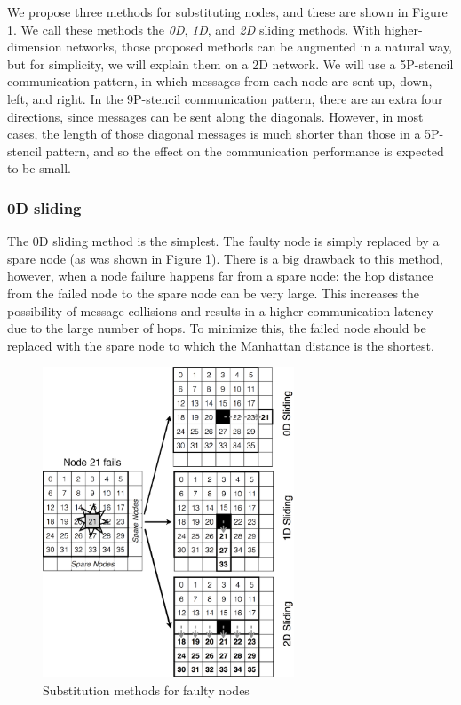\documentclass[Afour,times,sageh]{sagej}
\begin{document}
We propose three methods for substituting nodes, and these are shown
in Figure \ref{fig:node-substitution}. We call these methods the {\it
  0D}, {\it 1D}, and {\it 2D} sliding methods. With higher-dimension
networks, those proposed methods can be augmented in a natural way,
but for simplicity, we will explain them on a 2D network. We will use
a 5P-stencil communication pattern, in which messages from each node
are sent up, down, left, and right. In the 9P-stencil communication
pattern, there are an extra four directions, since messages can be
sent along the diagonals. However, in most cases, the length of those
diagonal messages is much shorter than those in a 5P-stencil pattern,
and so the effect on the communication performance is expected to be
small.

\subsubsection{0D sliding}\label{sec:0d-sliding}

The 0D sliding method is the simplest. The faulty node is simply
replaced by a spare node (as was shown in Figure
\ref{fig:node-substitution}). There is a big drawback to this method,
however, when a node failure happens far from a spare node: the hop
distance from the failed node to the spare node can be very
large. This increases the possibility of message collisions and
results in a higher communication latency due to the large number of
hops. To minimize this, the failed node should be replaced with the
spare node to which the Manhattan distance is the shortest.

\begin{figure}[ht]
\centering
\includegraphics[width=75mm]{Figs/SpareNode.eps}
  \caption{Substitution methods for faulty nodes}
  \label{fig:node-substitution}
\end{figure}
\end{document}
